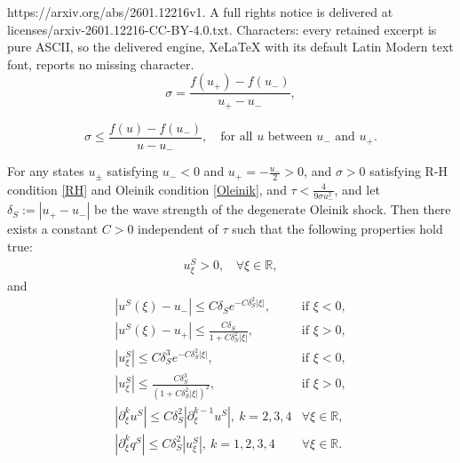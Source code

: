 \documentclass[10pt,a4paper]{amsart}
\begin{document}
https://arxiv.org/abs/2601.12216v1. A full rights notice is delivered at licenses/arxiv-2601.12216-CC-BY-4.0.txt. Characters: every retained excerpt is pure ASCII, so the delivered engine, XeLaTeX with its default Latin Modern text font, reports no missing character.
		\begin{equation}\label{RH}
			\sigma=\frac{f\left(u_{+}\right)-f\left(u_{-}\right)}{u_{+}-u_{-}},
		\end{equation}

		\begin{equation}\label{Oleinik}
			\sigma \leq \frac{f(u)-f\left(u_{-}\right)}{u-u_{-}}, \quad \text{for all } u \text{ between } u_{-} \text{ and } u_{+}.
		\end{equation}

	\begin{lemma}\label{lem0}
		For any states $u_{\pm}$ satisfying $u_{-}< 0$ and $u_{+}=-\frac{u_{-}}{2}>0$, and
		$\sigma>0$ satisfying R-H condition \eqref{RH} and Oleinik condition \eqref{Oleinik}, and $\tau<\frac{4}{9\sigma u_{-}^2}$, and let $\delta_{S} := |u_{+}-u_{-}|$ be the wave strength of the degenerate Oleinik shock. Then there exists a constant $C > 0$ independent of $\tau$ such that the following properties hold true:
		\begin{align*}
			u_{\xi}^{S}>0,\ \  \ \ \forall \xi\in \mathbb{R},
		\end{align*}
		and
		\begin{equation*}
			\begin{array}{ll}
				\left|u^S(\xi)-u_{-}\right| \leq C \delta_S e^{-C \delta_S^2|\xi|}, & \text {if } \xi<0, \\
				\left|u^S(\xi)-u_{+}\right| \leq \frac{C \delta_S}{1+C \delta_S^2|\xi|}, & \text {if } \xi>0, \\
				\left|u_{\xi}^S\right| \leq C \delta_S^3 e^{-C \delta_S^2|\xi|}, & \text {if } \xi<0, \\
				\left|u_{\xi}^S\right| \leq \frac{C \delta_S^3}{\left(1+C \delta_S^2|\xi|\right)^2}, & \text {if } \xi>0, \\
				\left|\partial_{\xi}^{k}u^S\right| \leq C \delta_S^2\left|\partial_{\xi}^{k-1}u^S\right|,\ k=2,3,4 &\forall \xi \in \mathbb{R}, \\
				\left|\partial_{\xi}^{k}q^{S}\right|\leq C\delta_{S}^2\left|u^{S}_{\xi}\right|,\ k=1,2,3,4 &\forall \xi \in \mathbb{R}.
			\end{array}
		\end{equation*}
	\end{lemma}
\end{document}
